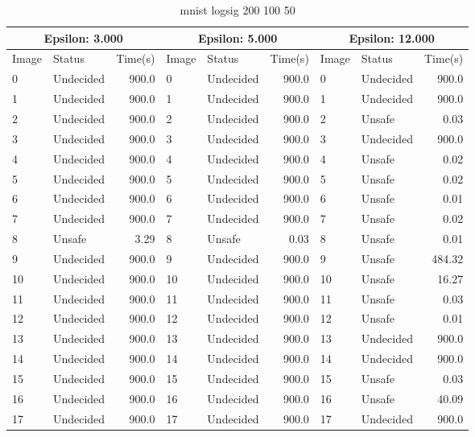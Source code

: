 \begin{table}[!ht]
  \centering
  \caption{mnist logsig 200 100 50}
  \footnotesize
  \begin{tabular}{|llr|llr|llr|}
    \toprule
    \multicolumn{3}{|c|}{Epsilon: 3.000} & \multicolumn{3}{|c|}{Epsilon: 5.000} & \multicolumn{3}{|c|}{Epsilon: 12.000} \\
    \midrule
    Image & Status & Time(s) &Image & Status & Time(s) &Image & Status & Time(s)\\ 
    \midrule
    0 & Undecided & 900.0 &    0 & Undecided & 900.0 &    0 & Undecided & 900.0\\ 
    1 & Undecided & 900.0 &    1 & Undecided & 900.0 &    1 & Undecided & 900.0\\ 
    2 & Undecided & 900.0 &    2 & Undecided & 900.0 &    2 & Unsafe & 0.03\\ 
    3 & Undecided & 900.0 &    3 & Undecided & 900.0 &    3 & Undecided & 900.0\\ 
    4 & Undecided & 900.0 &    4 & Undecided & 900.0 &    4 & Unsafe & 0.02\\ 
    5 & Undecided & 900.0 &    5 & Undecided & 900.0 &    5 & Unsafe & 0.02\\ 
    6 & Undecided & 900.0 &    6 & Undecided & 900.0 &    6 & Unsafe & 0.01\\ 
    7 & Undecided & 900.0 &    7 & Undecided & 900.0 &    7 & Unsafe & 0.02\\ 
    8 & Unsafe & 3.29 &    8 & Unsafe & 0.03 &    8 & Unsafe & 0.01\\ 
    9 & Undecided & 900.0 &    9 & Undecided & 900.0 &    9 & Unsafe & 484.32\\ 
    10 & Undecided & 900.0 &    10 & Undecided & 900.0 &    10 & Unsafe & 16.27\\ 
    11 & Undecided & 900.0 &    11 & Undecided & 900.0 &    11 & Unsafe & 0.03\\ 
    12 & Undecided & 900.0 &    12 & Undecided & 900.0 &    12 & Unsafe & 0.01\\ 
    13 & Undecided & 900.0 &    13 & Undecided & 900.0 &    13 & Undecided & 900.0\\ 
    14 & Undecided & 900.0 &    14 & Undecided & 900.0 &    14 & Undecided & 900.0\\ 
    15 & Undecided & 900.0 &    15 & Undecided & 900.0 &    15 & Unsafe & 0.03\\ 
    16 & Undecided & 900.0 &    16 & Undecided & 900.0 &    16 & Unsafe & 40.09\\ 
    17 & Undecided & 900.0 &    17 & Undecided & 900.0 &    17 & Undecided & 900.0\\ 

\end{tabular}
\end{table}
